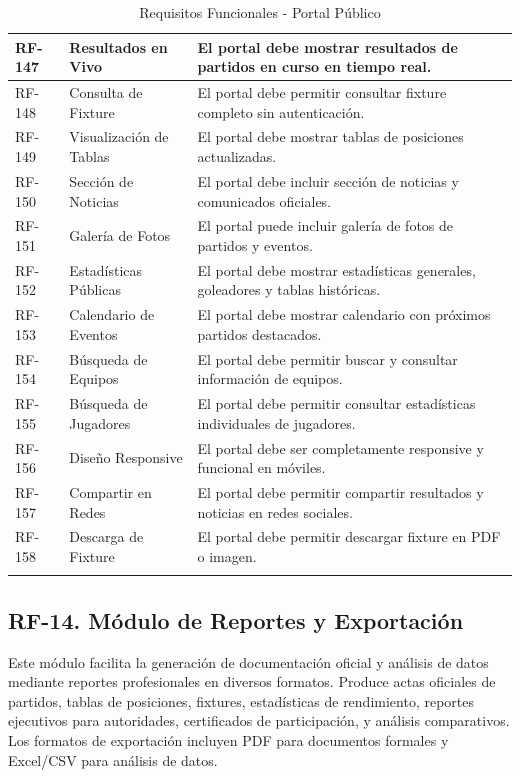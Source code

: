 \documentclass[12pt,a4paper]{article}
\begin{document}
\begin{longtable}{|>{\centering\arraybackslash}p{1.5cm}|>{\raggedright\arraybackslash}p{3.2cm}|>{\raggedright\arraybackslash}p{9cm}|}
RF-147 & Resultados en Vivo & El portal debe mostrar resultados de partidos en curso en tiempo real. \\
\hline
\rowcolor{rowgray}
RF-148 & Consulta de Fixture & El portal debe permitir consultar fixture completo sin autenticación. \\
\hline
RF-149 & Visualización de Tablas & El portal debe mostrar tablas de posiciones actualizadas. \\
\hline
\rowcolor{rowgray}
RF-150 & Sección de Noticias & El portal debe incluir sección de noticias y comunicados oficiales. \\
\hline
RF-151 & Galería de Fotos & El portal puede incluir galería de fotos de partidos y eventos. \\
\hline
\rowcolor{rowgray}
RF-152 & Estadísticas Públicas & El portal debe mostrar estadísticas generales, goleadores y tablas históricas. \\
\hline
RF-153 & Calendario de Eventos & El portal debe mostrar calendario con próximos partidos destacados. \\
\hline
\rowcolor{rowgray}
RF-154 & Búsqueda de Equipos & El portal debe permitir buscar y consultar información de equipos. \\
\hline
RF-155 & Búsqueda de Jugadores & El portal debe permitir consultar estadísticas individuales de jugadores. \\
\hline
\rowcolor{rowgray}
RF-156 & Diseño Responsive & El portal debe ser completamente responsive y funcional en móviles. \\
\hline
RF-157 & Compartir en Redes & El portal debe permitir compartir resultados y noticias en redes sociales. \\
\hline
\rowcolor{rowgray}
RF-158 & Descarga de Fixture & El portal debe permitir descargar fixture en PDF o imagen. \\
\hline
\caption{Requisitos Funcionales - Portal Público}
\end{longtable}

\subsection{RF-14. Módulo de Reportes y Exportación}

Este módulo facilita la generación de documentación oficial y análisis de datos mediante reportes profesionales en diversos formatos. Produce actas oficiales de partidos, tablas de posiciones, fixtures, estadísticas de rendimiento, reportes ejecutivos para autoridades, certificados de participación, y análisis comparativos. Los formatos de exportación incluyen PDF para documentos formales y Excel/CSV para análisis de datos.
\end{document}
